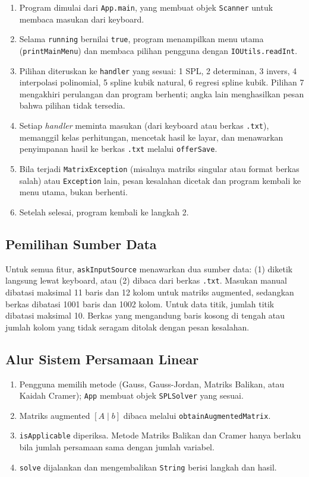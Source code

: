 \documentclass[12pt,a4paper]{report}
\begin{document}
\begin{enumerate}
  \item Program dimulai dari \texttt{App.main}, yang membuat objek
    \texttt{Scanner} untuk membaca masukan dari keyboard.
  \item Selama \texttt{running} bernilai \texttt{true}, program menampilkan
    menu utama (\texttt{printMainMenu}) dan membaca pilihan pengguna dengan
    \texttt{IOUtils.readInt}.
  \item Pilihan diteruskan ke \texttt{handler} yang sesuai: 1 SPL,
    2 determinan, 3 invers, 4 interpolasi polinomial, 5 spline kubik natural,
    6 regresi spline kubik. Pilihan 7 mengakhiri perulangan dan program
    berhenti; angka lain menghasilkan pesan bahwa pilihan tidak tersedia.
  \item Setiap \textit{handler} meminta masukan (dari keyboard atau berkas
    \texttt{.txt}), memanggil kelas perhitungan, mencetak hasil ke layar, dan
    menawarkan penyimpanan hasil ke berkas \texttt{.txt} melalui
    \texttt{offerSave}.
  \item Bila terjadi \texttt{MatrixException} (misalnya matriks singular atau
    format berkas salah) atau \texttt{Exception} lain, pesan kesalahan
    dicetak dan program kembali ke menu utama, bukan berhenti.
  \item Setelah selesai, program kembali ke langkah 2.
\end{enumerate}

\subsection{Pemilihan Sumber Data}

Untuk semua fitur, \texttt{askInputSource} menawarkan dua sumber data:
(1) diketik langsung lewat keyboard, atau (2) dibaca dari berkas \texttt{.txt}.
Masukan manual dibatasi maksimal 11 baris dan 12 kolom untuk matriks augmented,
sedangkan berkas dibatasi 1001 baris dan 1002 kolom. Untuk data titik,
jumlah titik dibatasi maksimal 10. Berkas yang mengandung baris kosong di
tengah atau jumlah kolom yang tidak seragam ditolak dengan pesan kesalahan.

\subsection{Alur Sistem Persamaan Linear}

\begin{enumerate}
  \item Pengguna memilih metode (Gauss, Gauss-Jordan, Matriks Balikan, atau
    Kaidah Cramer); \texttt{App} membuat objek \texttt{SPLSolver} yang sesuai.
  \item Matriks augmented $[A \mid b]$ dibaca melalui
    \texttt{obtainAugmentedMatrix}.
  \item \texttt{isApplicable} diperiksa. Metode Matriks Balikan dan Cramer
    hanya berlaku bila jumlah persamaan sama dengan jumlah variabel.
  \item \texttt{solve} dijalankan dan mengembalikan \texttt{String} berisi
    langkah dan hasil.
\end{enumerate}
\end{document}
